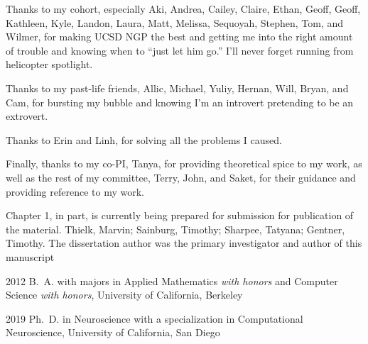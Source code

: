 \begin{frontmatter}
\begin{acknowledgements}
 Thanks to my cohort, especially Aki, Andrea, Cailey, Claire, Ethan, Geoff, Geoff, Kathleen, Kyle, Landon, Laura, Matt, Melissa, Sequoyah, Stephen, Tom, and Wilmer, for making UCSD NGP the best and getting me into the right amount of trouble and knowing when to ``just let him go.'' I'll never forget running from helicopter spotlight.
 
 Thanks to my past-life friends, Allic, Michael, Yuliy, Hernan, Will, Bryan, and Cam, for bursting my bubble and knowing I'm an introvert pretending to be an extrovert.
 
 Thanks to Erin and Linh, for solving all the problems I caused.
 
 Finally, thanks to my co-PI, Tanya, for providing theoretical spice to my work, as well as the rest of my committee, Terry, John, and Saket, for their guidance and providing reference to my work.
 
 \clearpage
 
 Chapter 1, in part, is currently being prepared for submission for publication of the material. Thielk, Marvin; Sainburg, Timothy; Sharpee, Tatyana; Gentner, Timothy. The dissertation author was the primary investigator and author of this manuscript
\end{acknowledgements}


%
%
\begin{vitapage}
\begin{vita}
  \item[2012] B.~A. with majors in Applied Mathematics \emph{with honors} and Computer Science \emph{with honors}, University of California, Berkeley
  \item[2019] Ph.~D. in Neuroscience with a specialization in Computational Neuroscience, University of California, San Diego
\end{vita}
\end{vitapage}



\end{frontmatter}
